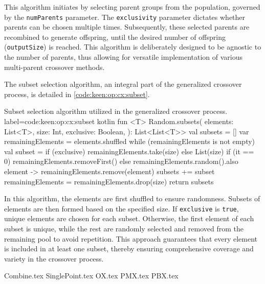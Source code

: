         This algorithm initiates by selecting parent groups from the population, governed by the \texttt{numParents} 
        parameter. The \texttt{exclusivity} parameter dictates whether parents can be chosen multiple times. 
        Subsequently, these selected parents are recombined to generate offspring, until the desired number of offspring 
        (\texttt{outputSize}) is reached. This algorithm is deliberately designed to be agnostic to the number of 
        parents, thus allowing for versatile implementation of various multi-parent crossover methods.

        The subset selection algorithm, an integral part of the generalized crossover process, is detailed in 
        \vref{code:keen:op:cx:subset}.

        \begin{code}{
            Subset selection algorithm utilized in the generalized crossover process.
        }{
            label=code:keen:op:cx:subset
        }{kotlin}
            fun <T> Random.subsets(
                elements: List<T>,
                size: Int,
                exclusive: Boolean,
            ): List<List<T>> {
                val subsets = []
                var remainingElements = elements.shuffled
                while (remainingElements is not empty) {
                    val subset = if (exclusive) {
                        remainingElements.take(size)
                    } else {
                        List(size) {
                            if (it == 0) remainingElements.removeFirst()
                            else remainingElements.random().also { 
                                element -> remainingElements.remove(element) 
                            }
                        }
                    }
                    subsets += subset
                    remainingElements = remainingElements.drop(size)
                }
                return subsets
            }
        \end{code}

        In this algorithm, the elements are first shuffled to ensure randomness. Subsets of elements are then formed 
        based on the specified size. If \texttt{exclusive} is \texttt{true}, unique elements are chosen for each subset. 
        Otherwise, the first element of each subset is unique, while the rest are randomly selected and removed from the 
        remaining pool to avoid repetition. This approach guarantees that every element is included in at least one 
        subset, thereby ensuring comprehensive coverage and variety in the crossover process.

    {Combine.tex}
    {SinglePoint.tex}
    {OX.tex}
    {PMX.tex}
    {PBX.tex}
  